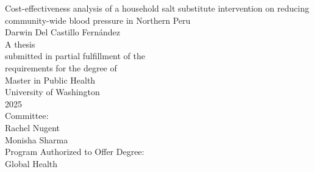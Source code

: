 
\usepackage[utf8x]{inputenc}
\usepackage{setspace}
\usepackage{titling}
\usepackage{fontspec}
\setmainfont{Times New Roman}

\newcommand{\thesistitle}{Cost-effectiveness analysis of a household salt substitute intervention on reducing community-wide blood pressure in Northern Peru}
\newcommand{\authorname}{Darwin Del Castillo Fernández}
\newcommand{\degreename}{Master in Public Health}
\newcommand{\graduationyear}{2025}
\newcommand{\chairname}{Rachel Nugent}
\newcommand{\chairdepartment}{Department of Global Health}
\newcommand{\committeememberone}{Monisha Sharma}
\newcommand{\departmentname}{Global Health}

\setlength{\droptitle}{0pt}
\linespread{2} %
\usepackage[a4paper, top=2.54cm, 
bottom=2.54cm, 
left=2.54cm, 
right=2.54cm,
footskip=1cm]{geometry} %



\thispagestyle{empty}
\begin{center}

\thesistitle\\[1cm]

\authorname\\[2cm]

A thesis\\
submitted in partial fulfillment of the\\
requirements for the degree of\\[1cm]

\degreename\\[2cm]

University of Washington\\[1cm]

\graduationyear\\[1cm]

Committee:\\
\chairname\\
\committeememberone\\[1cm]

Program Authorized to Offer Degree:\\
\departmentname\\[1cm]

\end{center}
\pagebreak

